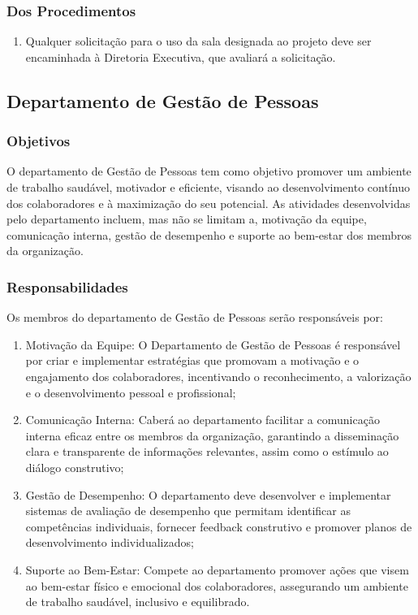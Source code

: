         \subsubsection{Dos Procedimentos}
            \begin{enumerate}
                \item Qualquer solicitação para o uso da sala designada ao projeto deve ser encaminhada à Diretoria Executiva, que avaliará a solicitação.
            \end{enumerate}

    \subsection{Departamento de Gestão de Pessoas}
        \subsubsection{Objetivos}
            O departamento de Gestão de Pessoas tem como objetivo promover um ambiente de trabalho saudável, motivador e eficiente, visando ao desenvolvimento contínuo dos colaboradores e à maximização do seu potencial. As atividades desenvolvidas pelo departamento incluem, mas não se limitam a, motivação da equipe, comunicação interna, gestão de desempenho e suporte ao bem-estar dos membros da organização.
        \subsubsection{Responsabilidades}
            Os membros do departamento de Gestão de Pessoas serão responsáveis por:
            \begin{enumerate}
                \item Motivação da Equipe: O Departamento de Gestão de Pessoas é responsável por criar e implementar estratégias que promovam a motivação e o engajamento dos colaboradores, incentivando o reconhecimento, a valorização e o desenvolvimento pessoal e profissional;
                \item Comunicação Interna: Caberá ao departamento facilitar a comunicação interna eficaz entre os membros da organização, garantindo a disseminação clara e transparente de informações relevantes, assim como o estímulo ao diálogo construtivo;
                \item Gestão de Desempenho: O departamento deve desenvolver e implementar sistemas de avaliação de desempenho que permitam identificar as competências individuais, fornecer feedback construtivo e promover planos de desenvolvimento individualizados;
                \item  Suporte ao Bem-Estar: Compete ao departamento promover ações que visem ao bem-estar físico e emocional dos colaboradores, assegurando um ambiente de trabalho saudável, inclusivo e equilibrado.
            \end{enumerate}
        
